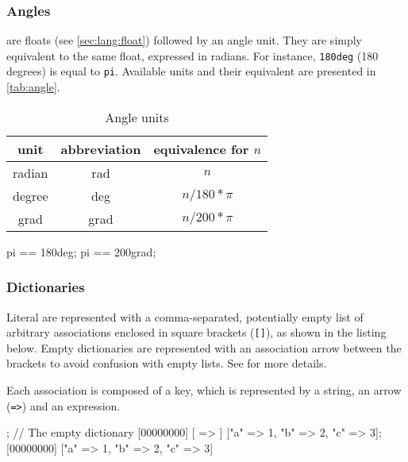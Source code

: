 \subsubsection{Angles}

 are floats (see \autoref{sec:lang:float})
followed by an angle unit. They are simply equivalent to the same
float, expressed in radians. For instance, \lstinline|180deg| (180
degrees) is equal to \lstinline|pi|. Available units and their
equivalent are presented in \autoref{tab:angle}.

\begin{table}[\floatposh]
  \centering
  \begin{tabular}{|c|c|c|}
    \hline
    unit        & abbreviation & equivalence for $n$  \\
    \hline
    radian      & rad          & $n$         \\
    degree      & deg          & $n / 180 * \pi$        \\
    grad        & grad         & $n / 200 * \pi$        \\
    \hline
  \end{tabular}
  \caption{Angle units}
  \label{tab:angle}
\end{table}

\begin{urbiassert}
pi == 180deg;
pi == 200grad;
\end{urbiassert}

\subsubsection{Dictionaries}
\label{sec:lang:dictionary}


Literal  are represented with a comma-separated,
potentially empty list of arbitrary associations enclosed in square brackets
(\lstinline|[]|), as shown in the listing below.  Empty dictionaries are
represented with an association arrow between the brackets to avoid
confusion with empty lists.  See  for more details.

Each association is composed of a key, which is represented by a string, an
arrow (\lstinline|=>|) and an expression.

\begin{urbiscript}
[ => ]; // The empty dictionary
[00000000] [ => ]
["a" => 1, "b" => 2, "c" => 3];
[00000000] ["a" => 1, "b" => 2, "c" => 3]
\end{urbiscript}

